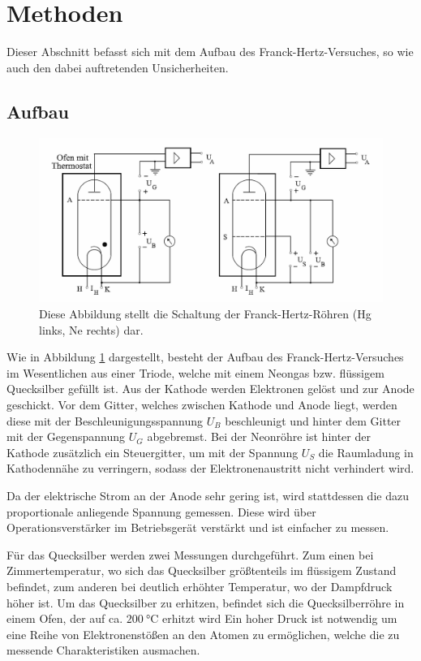 \section{Methoden}
	
	Dieser Abschnitt befasst sich mit dem Aufbau des Franck-Hertz-Versuches, so wie auch den dabei auftretenden Unsicherheiten.
	
	\subsection{Aufbau}		
		\begin{figure}[ht]
			\centering
			\includegraphics[width=\textwidth]{bilder/Aufbau.png}
			\caption{Diese Abbildung stellt die Schaltung der Franck-Hertz-Röhren (Hg links, Ne rechts) dar. \cite{WWU}}
			\label{fig:Aufbau}	
		\end{figure}	
		Wie in Abbildung \ref{fig:Aufbau} dargestellt, besteht der Aufbau des Franck-Hertz-Versuches im Wesentlichen aus einer Triode, welche mit einem Neongas bzw. flüssigem Quecksilber gefüllt ist. 
		Aus der Kathode werden Elektronen gelöst und zur Anode geschickt.
		Vor dem Gitter, welches zwischen Kathode und Anode liegt, werden diese mit der Beschleunigungsspannung	$U_B$ beschleunigt und hinter dem Gitter mit der Gegenspannung $U_G$ abgebremst.
		Bei der Neonröhre ist hinter der Kathode zusätzlich ein Steuergitter, um mit der Spannung $U_S$ die Raumladung in Kathodennähe zu verringern, sodass der Elektronenaustritt nicht verhindert wird.
		
		Da der elektrische Strom an der Anode sehr gering ist, wird stattdessen die dazu proportionale anliegende Spannung gemessen.
		Diese wird über Operationsverstärker im Betriebsgerät verstärkt und ist einfacher zu messen.
		  
		Für das Quecksilber werden zwei Messungen durchgeführt.
		Zum einen bei Zimmertemperatur, wo sich das Quecksilber größtenteils im flüssigem Zustand befindet, zum anderen bei deutlich erhöhter Temperatur, wo der Dampfdruck höher ist.
		Um das Quecksilber zu erhitzen, befindet sich die Quecksilberröhre in einem Ofen, der auf ca. $\SI{200}{\celsius}$ erhitzt wird
		Ein hoher Druck ist notwendig um eine Reihe von Elektronenstößen an den Atomen zu ermöglichen, welche die zu messende Charakteristiken ausmachen.
		
